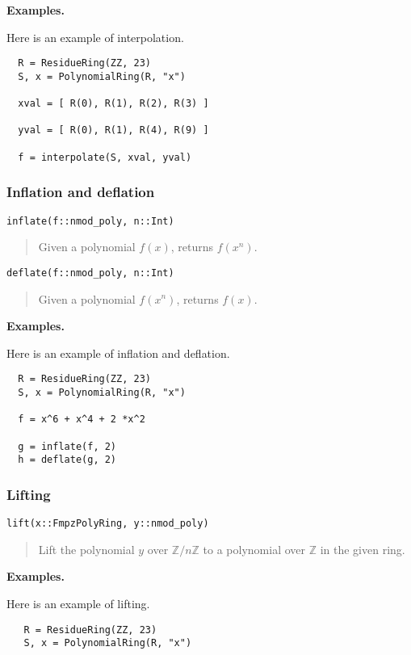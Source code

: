 \documentclass[a4paper,10pt]{article}
\newcommand{\Z}{\mathbb{Z}}
\newcommand{\desc}[1]{\vspace{-3mm}\begin{quote}#1\end{quote}}
\begin{document}
{{\textbf{Examples.}

Here is an example of interpolation.

\begin{lstlisting}
  R = ResidueRing(ZZ, 23)
  S, x = PolynomialRing(R, "x")

  xval = [ R(0), R(1), R(2), R(3) ]

  yval = [ R(0), R(1), R(4), R(9) ] 

  f = interpolate(S, xval, yval)
\end{lstlisting}

\subsubsection{Inflation and deflation}

\begin{lstlisting}
inflate(f::nmod_poly, n::Int)
\end{lstlisting}

\desc{Given a polynomial $f(x)$, returns $f(x^n)$.}

\begin{lstlisting}
deflate(f::nmod_poly, n::Int)
\end{lstlisting}

\desc{Given a polynomial $f(x^n)$, returns $f(x)$.}

\textbf{Examples.}

Here is an example of inflation and deflation.

\begin{lstlisting}
  R = ResidueRing(ZZ, 23)
  S, x = PolynomialRing(R, "x")

  f = x^6 + x^4 + 2 *x^2 

  g = inflate(f, 2)
  h = deflate(g, 2)
\end{lstlisting}

\subsubsection{Lifting}

\begin{lstlisting}
lift(x::FmpzPolyRing, y::nmod_poly)
\end{lstlisting}

\desc{Lift the polynomial $y$ over $\Z/n\Z$ to a polynomial over $\Z$ in the given ring.}

\textbf{Examples.}

Here is an example of lifting.

\begin{lstlisting}
   R = ResidueRing(ZZ, 23)
   S, x = PolynomialRing(R, "x")


\end{lstlisting}}}
\end{document}
